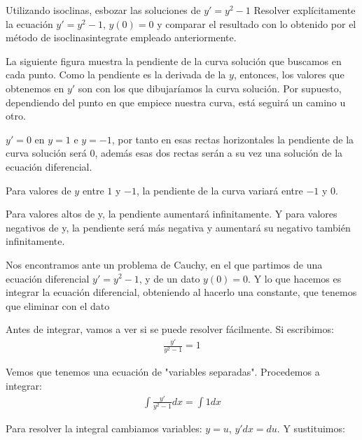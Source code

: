 \documentclass[nochap]{apuntes}
\begin{document}
\begin{problem}[4]
\ppart Utilizando isoclinas, esbozar las soluciones de $y'=y^2-1$
\ppart Resolver explícitamente la ecuación $y'=y^2-1$, $y(0)=0$ y comparar el resultado con lo obtenido por el método de isoclinasintegrate empleado anteriormente.

\solution



\spart
\begin{expla}
La siguiente figura muestra la pendiente de la curva solución que buscamos en cada punto. Como la pendiente es la derivada de la $y$, entonces, los valores que obtenemos en $y'$ son con los que dibujaríamos la curva solución. Por supuesto, dependiendo del punto en que empiece nuestra curva, está seguirá un camino u otro.

\end{expla}
$y'=0$ en $y=1$ e $y=-1$, por tanto en esas rectas horizontales la pendiente de la curva solución será 0, además esas dos rectas serán a su vez una solución de la ecuación diferencial.

Para valores de $y$ entre $1$ y $-1$, la pendiente de la curva variará entre $-1$ y $0$.

Para valores altos de y, la pendiente aumentará infinitamente. Y para valores negativos de y, la pendiente será más negativa y aumentará su negativo también infinitamente.


\newpage
\spart 
\begin{expla}
Nos encontramos ante un problema de Cauchy, en el que partimos de una ecuación diferencial $y'=y^2-1$, y de un dato $y(0)=0$. Y lo que hacemos es integrar la ecuación diferencial, obteniendo al hacerlo una constante, que tenemos que eliminar con el dato
\end{expla}
Antes de integrar, vamos a ver si se puede resolver fácilmente. Si escribimos:
\begin{gather*}
\frac{y'}{y^2-1}=1
\end{gather*}

Vemos que tenemos una ecuación de "variables separadas". Procedemos a integrar:
\begin{gather*}
\int\frac{y'}{y^2-1}dx=\int1dx
\end{gather*}

\begin{expla}
Para resolver la integral cambiamos variables: $y=u$, $y'dx=du$. Y sustituimos:


\end{expla}
\end{problem}
\end{document}
